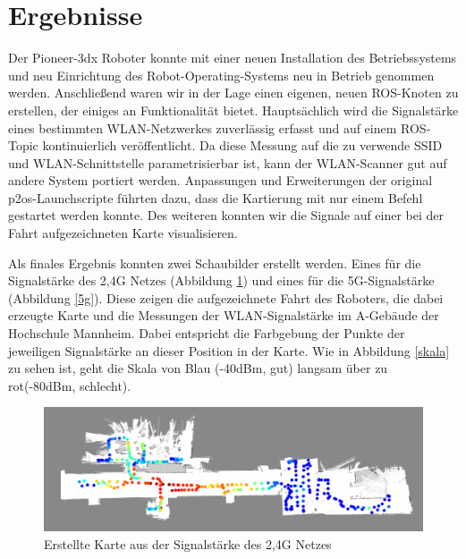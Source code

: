 \documentclass{scrartcl}%
\begin{document}
\newpage
\section{Ergebnisse}
Der Pioneer-3dx Roboter konnte mit einer neuen Installation des Betriebssystems und neu Einrichtung des Robot-Operating-Systems neu in Betrieb genommen werden. Anschließend waren wir in der Lage  einen eigenen, neuen ROS-Knoten zu erstellen, der einiges an Funktionalität bietet. Hauptsächlich wird die Signalstärke eines bestimmten WLAN-Netzwerkes zuverlässig erfasst und auf einem ROS-Topic kontinuierlich veröffentlicht. Da diese Messung auf die zu verwende SSID und WLAN-Schnittstelle parametrisierbar ist, kann der WLAN-Scanner gut auf andere System portiert werden. Anpassungen und Erweiterungen der original p2os-Launchscripte führten dazu, dass die Kartierung mit nur einem Befehl gestartet werden konnte. Des weiteren konnten wir die Signale auf einer bei der Fahrt aufgezeichneten Karte visualisieren. 


Als finales Ergebnis konnten zwei Schaubilder erstellt werden. Eines für die Signalstärke des 2,4G Netzes (Abbildung \ref{2g4}) und eines für die 5G-Signalstärke (Abbildung \ref{5g}). Diese zeigen die aufgezeichnete Fahrt des Roboters, die dabei erzeugte Karte und die Messungen der WLAN-Signalstärke im A-Gebäude der Hochschule Mannheim. Dabei entspricht die Farbgebung der Punkte der jeweiligen Signalstärke an dieser Position in der Karte. Wie in Abbildung \ref{skala} zu sehen ist, geht die Skala von Blau (-40dBm, gut) langsam über zu rot(-80dBm, schlecht).


\begin{figure}[h!]
	\centering
	\includegraphics[width=\textwidth]{bilder/wlan-heatmap-2G4.png}
	\caption{Erstellte Karte aus der Signalstärke des 2,4G Netzes}
	\label{2g4}
\end{figure}
\end{document}
